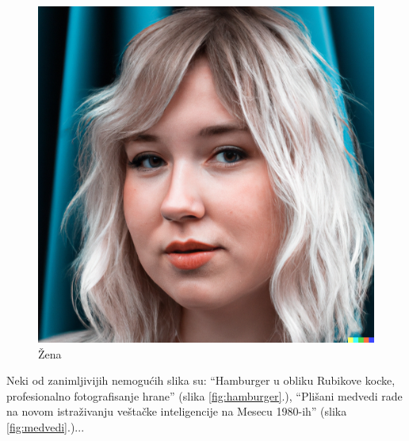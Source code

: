 \documentclass[a4paper]{article}
\begin{document}
\begin{nesto1}
\begin{figure}[h!]
\begin{center}
\includegraphics[scale=0.10]{zena.jpg}
\end{center}
\caption{Žena}
\label{fig:zena}
\end{figure}
\newpage

Neki od zanimljivijih nemogućih slika su: “Hamburger u obliku Rubikove kocke, profesionalno fotografisanje hrane” (slika \ref{fig:hamburger}.), “Plišani medvedi rade na novom istraživanju veštačke inteligencije na Mesecu 1980-ih” (slika \ref{fig:medvedi}.)...


\end{nesto1}
\end{document}
